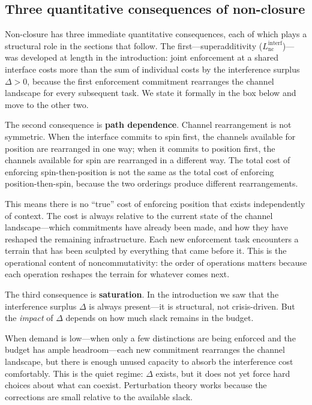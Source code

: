 \documentclass[11pt]{article}
\begin{document}
\subsection{Three quantitative consequences of non-closure}

Non-closure has three immediate quantitative consequences, each of which plays a structural role in the sections that follow.  The first---superadditivity ($L_{\mathrm{nc}}^{\mathrm{interf}}$)---was developed at length in the introduction: joint enforcement at a shared interface costs more than the sum of individual costs by the interference surplus $\Delta > 0$, because the first enforcement commitment rearranges the channel landscape for every subsequent task.  We state it formally in the box below and move to the other two.

The second consequence is \textbf{path dependence}.  Channel rearrangement is not symmetric.  When the interface commits to spin first, the channels available for position are rearranged in one way; when it commits to position first, the channels available for spin are rearranged in a different way.  The total cost of enforcing spin-then-position is not the same as the total cost of enforcing position-then-spin, because the two orderings produce different rearrangements.

This means there is no ``true'' cost of enforcing position that exists independently of context.  The cost is always relative to the current state of the channel landscape---which commitments have already been made, and how they have reshaped the remaining infrastructure.  Each new enforcement task encounters a terrain that has been sculpted by everything that came before it.  This is the operational content of noncommutativity: the order of operations matters because each operation reshapes the terrain for whatever comes next.

The third consequence is \textbf{saturation}.  In the introduction we saw that the interference surplus $\Delta$ is always present---it is structural, not crisis-driven.  But the \emph{impact} of $\Delta$ depends on how much slack remains in the budget.

When demand is low---when only a few distinctions are being enforced and the budget has ample headroom---each new commitment rearranges the channel landscape, but there is enough unused capacity to absorb the interference cost comfortably.  This is the quiet regime: $\Delta$ exists, but it does not yet force hard choices about what can coexist.  Perturbation theory works because the corrections are small relative to the available slack.
\end{document}
